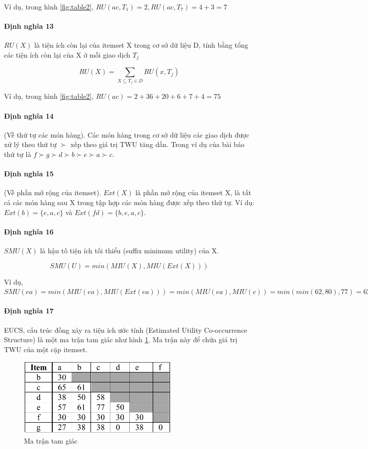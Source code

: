 Ví dụ, trong hình \ref{fig:table2}, $RU(ac, T_1) = 2, RU(ac, T_7) = 4 + 3 = 7 $  

\paragraph{Định nghĩa 13} $RU(X)$ là tiện ích còn lại của itemset X trong cơ sở dữ liệu D, tính bằng tổng các tiện ích còn lại của X ở mỗi giao dịch $T_j$

$$ RU(X) = \sum_{X \subseteq T_j \in D} RU(x, T_j) $$

Ví dụ, trong hình \ref{fig:table2}, $RU(ac) = 2 + 36 + 20 + 6 + 7 + 4 = 75$

\paragraph{Định nghĩa 14} (Về thứ tự các món hàng). Các món hàng trong cơ sở dữ liệu các giao dịch được xử lý theo thứ tự $\succ$ xếp theo giá trị TWU tăng dần. Trong ví dụ của bài báo thứ tự là $ f \succ g \succ d \succ b \succ e \succ a \succ c $.

\paragraph{Định nghĩa 15} (Về phần mở rộng của itemset). $Ext(X)$ là phần mở rộng của itemset X, là tất cả các món hàng sau X trong tập hợp các món hàng được xếp theo thứ tự. Ví dụ: $Ext(b) = \{ e, a, c \}$ và $Ext(fd) = \{b, e, a, c \}$.

\paragraph{Định nghĩa 16} $SMU(X)$ là hậu tố tiện ích tối thiểu (suffix minimum utility) của X. 

$$ SMU(U) = min(MIU(X), MIU(Ext(X))) $$

Ví dụ, $SMU(ea) = min(MIU(ea), MIU(Ext(ea))) = min (MIU(ea), MIU(c)) = min(min(62, 80), 77) = 62$

\paragraph{Định nghĩa 17} EUCS, cấu trúc đồng xảy ra tiện ích ước tính (Estimated Utility Co-occurrence Structure) \cite{fournier2014fhm} là một ma trận tam giác như hình \ref{fig:eucs}. Ma trận này để chứa giá trị TWU của một cặp itemset. 

\begin{figure}[h]
\centering
\includegraphics[width=0.7\textwidth]{image/fig/trianglematrix.PNG}
\caption{\label{fig:eucs} Ma trận tam giác  }
\end{figure}